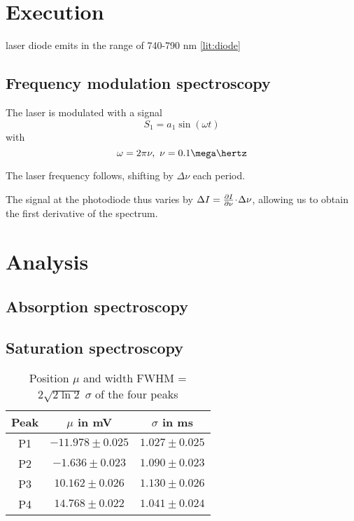 
\section{Execution} %

laser diode emits in the range of 740-790 nm \ref{lit:diode}

\subsection{Frequency modulation spectroscopy}
The laser is modulated with a signal
\begin{equation}
 S_1 = a_1 \sin(\omega t)
\end{equation}
with
\begin{equation}
 \omega = 2 \pi \nu,~ \nu = 0.1 \mega\hertz
\end{equation}

The laser frequency follows, shifting by $\Delta \nu$ each period.

The signal at the photodiode thus varies by $\Delta I = \frac{\partial I}{\partial\nu} \!\cdot\! \Delta \nu$, allowing us to obtain the first derivative of the spectrum.


\section{Analysis}
\subsection{Absorption spectroscopy}


\subsection{Saturation spectroscopy}


\begin{table}
 \centering
 \caption{Position $\mu$ and width FWHM = $2 \sqrt{2 \ln 2} \; \sigma$ of the four peaks}
 \label{tab:raw}
 \begin{tabular}{ccc}
  \toprule
  Peak	& $\mu$ in mV 		& $\sigma$ in ms \\
  \midrule
  P1	& $-11.978 \pm 0.025$	& $1.027 \pm 0.025$ \\
  P2	& $-1.636 \pm 0.023$	& $1.090 \pm 0.023$ \\
  P3	& $10.162 \pm 0.026$	& $1.130 \pm 0.026$ \\
  P4	& $14.768 \pm 0.022$	& $1.041 \pm 0.024$ \\
  \bottomrule
 \end{tabular}
\end{table}

